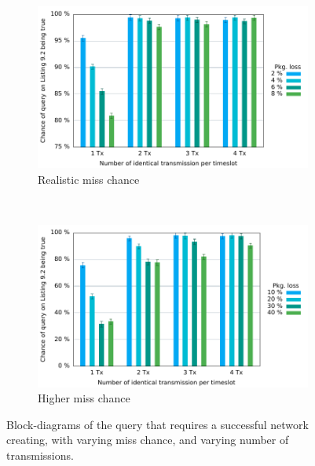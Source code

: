 \begin{figure}[p]
	\begin{subfigure}{\linewidth}
  \includegraphics{Figures/Graphs/gnuplot/ccucChance/graph2.pdf} 
\caption{Realistic miss chance}
\label{CCUC-Graph-UPPAAL}
\end{subfigure}\\
\begin{subfigure}{\linewidth}
\includegraphics{Figures/Graphs/gnuplot/ccucChance/graph3.pdf} 
\caption{Higher miss chance}
\label{fig:crazy_graph}
\end{subfigure}
\caption{Block-diagrams of the query that requires a successful network creating, with varying miss chance, and varying number of transmissions.}
\end{figure} 


